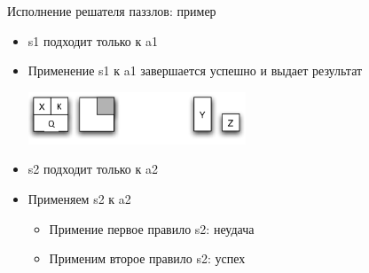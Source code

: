 \documentclass[aspectratio=169
  , xcolor={svgnames}
  , hyperref={ colorlinks,citecolor=DeepPink4
             , linkcolor=DarkRed,urlcolor=DarkBlue}
  , russian
  ]{beamer}
\theoremstyle{exerciseStyle1}
\begin{document}
\begin{frame}[fragile]{Исполнение решателя паззлов: пример}
\begin{minipage}{.48\textwidth}
\begin{itemize}
\item s1 подходит только к a1 
\item Применение s1 к a1 завершается успешно и выдает результат

\includegraphics[width=6.5cm]{figures/puz-example3}
\item s2 подходит только к a2
\item Применяем s2 к a2
\begin{itemize}
\item Примение первое правило s2: неудача
\item Применим второе правило s2: успех
\end{itemize}
\end{itemize}
\end{minipage}
\end{frame}
\end{document}
